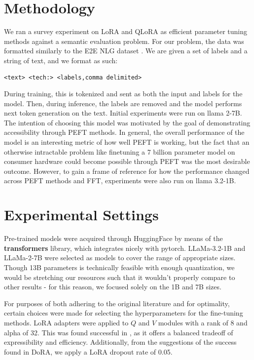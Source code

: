 \documentclass[11pt]{article}
\begin{document}
\section{Methodology}

We ran a survey experiment on LoRA and QLoRA as efficient parameter tuning methods against a semantic evaluation problem. For our problem, the data was formatted similarly to the E2E NLG dataset \cite{novikova2017e2e}. We are given a set of labels and a string of text, and we format as such:
\begin{verbatim}
<text> <tech:> <labels,comma delimited>
\end{verbatim}

During training, this is tokenized and sent as both the input and labels for the model. Then, during inference, the labels are removed and the model performs next token generation on the text. Initial experiments were run on llama 2-7B. The intention of choosing this model was motivated by the goal of demonstrating accessibility through PEFT methods. In general, the overall performance of the model is an interesting metric of how well PEFT is working, but the fact that an otherwise intractable problem like finetuning a 7 billion parameter model on consumer hardware could become possible through PEFT was the most desirable outcome. However, to gain a frame of reference for how the performance changed across PEFT methods and FFT, experiments were also run on llama 3.2-1B.


\section{Experimental Settings}

Pre-trained models were acquired through HuggingFace by means of the \textbf{transformers} library, which integrates nicely with pytorch. LLaMa-3.2-1B and LLaMa-2-7B were selected as models to cover the range of appropriate sizes. Though 13B parameters is technically feasible with enough quantization, we would be stretching our resources such that it wouldn't properly compare to other results - for this reason, we focused solely on the 1B and 7B sizes.

For purposes of both adhering to the original literature and for optimality, certain choices were made for selecting the hyperparameters for the fine-tuning methods. LoRA adapters were applied to $Q$ and $V$ modules with a rank of 8 and alpha of 32. This was found successful in \cite{hu2021lora}, as it offers a balanced tradeoff of expressibility and efficiency. Additionally, from the suggestions of the success found in DoRA, we apply a LoRA dropout rate of 0.05\cite{liu2024dora}.
\end{document}

